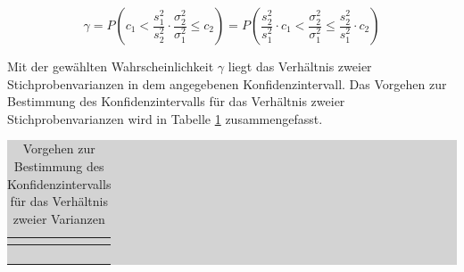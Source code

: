 \begin{equation}\label{eq:fivehundrednine}
\gamma =P\left(c_{1} <\dfrac{s_{1}^{2} }{s_{2}^{2} } \cdot \dfrac{\sigma _{2}^{2} }{\sigma _{1}^{2} } \le c_{2} \right)=P\left(\dfrac{s_{2}^{2} }{s_{1}^{2} } \cdot c_{1} <\dfrac{\sigma _{2}^{2} }{\sigma _{1}^{2} } \le \dfrac{s_{2}^{2} }{s_{1}^{2} } \cdot c_{2} \right)
\end{equation}

\noindent Mit der gew\"{a}hlten Wahrscheinlichkeit $\gamma$ liegt das Verh\"{a}ltnis zweier Stichprobenvarianzen in dem angegebenen Konfidenzintervall. Das Vorgehen zur Bestimmung des Konfidenzintervalls f\"{u}r das Verh\"{a}ltnis zweier Stichprobenvarianzen wird in Tabelle \ref{tab:fiveten} zusammengefasst.

\clearpage

\begin{table}[H]
\setlength{\arrayrulewidth}{.1em}
\caption{Vorgehen zur Bestimmung des Konfidenzintervalls f\"{u}r das Verh\"{a}ltnis zweier Varianzen}
\setlength{\fboxsep}{0pt}%
\colorbox{lightgray}{%
%
\begin{tabular}{| c | c |}
\hline
\parbox[c][0.3in][c]{0.4in}{\smallskip\centering\textbf{\selectfont{Nr.}}} & 
\parbox[c][0.3in][c]{6.2in}{\smallskip\centering\textbf{\selectfont{Prozessschritt}}}\\ \hline

\parbox[c][0.3in][c]{0.4in}{\centering{}\selectfont{1}} & 
\parbox[c][0.3in][c]{6.2in}{\centering{}\selectfont{Wahl einer Konfidenzzahl $\gamma$}}\\ \hline

\parbox[c][0.9in][c]{0.4in}{\centering{}\selectfont{2}} & 
\parbox[c][0.9in][c]{6.2in}{\centering{}}\\ \hline

\parbox[c][0.9in][c]{0.4in}{\centering{}\selectfont{3}} & 
\parbox[c][0.9in][c]{6.2in}{\centering{}}\\ \hline

\parbox[c][0.9in][c]{0.4in}{\centering{}\selectfont{4}} & 
\parbox[c][0.9in][c]{6.2in}{\centering{}}\\ \hline

\end{tabular}%
}
\label{tab:fiveten}
\end{table}

